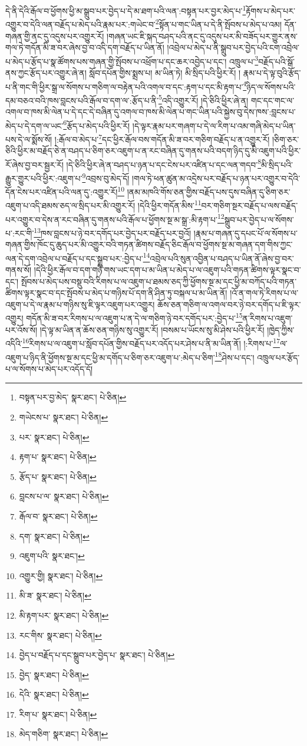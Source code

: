 དེ་ནི་དེའི་རྒོལ་བ་ཕྱོགས་ཕྱི་མ་སྒྲུབ་པར་བྱེད་པ་དེ་མ་ཐག་པའི་ལན་:བསྟན་པར་བྱར་མེད་པ་\footnote{བསྟན་པར་བྱ་མེད་  སྣར་ཐང་།  པེ་ཅིན། }རྟོགས་པ་མེད་པར་འགྱུར་བ་དེའི་ལན་བརྗོད་པ་མེད་པའི་རྣམ་པར་:གཡེང་བ་\footnote{གཡེངས་པ་  སྣར་ཐང་།  པེ་ཅིན། }སྟོན་པ་གང་ཡིན་པ་དེ་ནི་སྤོབས་པ་མེད་པ་འམ། དོན་གཞན་གྱི་ནང་དུ་འདུས་པར་འགྱུར་རོ། །གཞན་ཡང་ཇི་སྐད་བཤད་པའི་ནང་དུ་འདུས་པར་མི་བཟོད་པར་གྱུར་ནས་གལ་ཏེ་གདོན་མི་ཟ་བར་ཞེས་བྱ་བ་འདི་དག་བརྗོད་པ་ཡིན་ནོ། །འབྲེལ་པ་མེད་པ་ནི་སྒྲུབ་པར་བྱེད་པའི་ངག་འབྲེལ་པ་མེད་པ་རྩོད་པ་སྣ་ཚོགས་པས་གཞན་གྱི་སྤོབས་པ་འཕྲོག་པ་དང་ཆར་འབྱེད་པ་དང་། འཁྲུལ་པ་\footnote{པར་  སྣར་ཐང་།  པེ་ཅིན། }བརྗོད་པའི་སྒོ་ནས་ཀྱང་རྩོད་པར་འགྱུར་ཞེ་ན། སློབ་དཔོན་གྱིས་སྨྲས་པ། མ་ཡིན་ཏེ། མི་སྲིད་པའི་ཕྱིར་རོ། །
རྣམ་པ་དེ་ལྟ་བུའི་རྩོད་པ་ནི་གང་གི་ཕྱིར་སྒྲ་ལ་སོགས་པ་གཅིག་ལ་བརྟེན་པའི་འགལ་བ་དང་:རྟག་པ་དང་མི་རྟག་པ་\footnote{རྟག་པ་  སྣར་ཐང་།  པེ་ཅིན། }ཉིད་ལ་སོགས་པའི་དམ་བཅའ་བའི་ཁས་བླངས་པའི་རྒོལ་བ་དག་ལ་:རྩོད་པ་ནི་\footnote{རྩོད་པ་  སྣར་ཐང་།  པེ་ཅིན། }འདི་འགྱུར་རོ། །དེ་ཅིའི་ཕྱིར་ཞེ་ན། གང་དང་གང་ལ་འགལ་བ་ཁས་མི་ལེན་པ་དེ་དང་དེ་བཞིན་དུ་འགལ་བ་ཁས་མི་ལེན་པ་གང་ཡིན་པའི་སྐྱེས་བུ་དེས་ཁས་:བླངས་པ་མེད་པ་དེ་དག་ལ་ཡང་\footnote{བླངས་པ་ལ་  སྣར་ཐང་།  པེ་ཅིན། }རྩོད་པ་མེད་པའི་ཕྱིར་རོ། །དེ་ལྟར་རྣམ་པར་གཞག་པ་དེ་ལ་རིག་པ་འམ་གཞི་མེད་པ་ཡིན་པས་དེ་ལ་སྨོས་སོ། །:རྒོལ་བ་མེད་པ་\footnote{རྒོལ་བ་  སྣར་ཐང་།  པེ་ཅིན། }དང་ཕྱིར་རྒོལ་བས་གདོན་མི་ཟ་བར་གཅིག་བརྗོད་པ་ན་འགྱུར་རོ། །ཅིག་ཅར་ཅིའི་ཕྱིར་མ་བརྗོད་ཅེ་ན་བཤད་པ་ཅིག་ཅར་འཇུག་པ་ན་རང་བཞིན་དུ་གནས་པའི་བདག་ཉིད་དུ་མི་འཇུག་པའི་ཕྱིར་རོ་ཞེས་བྱ་བར་སྦྱར་རོ། །དེ་ཅིའི་ཕྱིར་ཞེ་ན་བཤད་པ་ཉན་པ་དང་ངེས་པར་འཛིན་པ་དང་ལན་གདབ་\footnote{དག་  སྣར་ཐང་།  པེ་ཅིན། }མི་སྲིད་པའི་རྒྱུར་གྱུར་པའི་ཕྱིར་:འཇུག་པ་\footnote{འཇུག་པའི་  སྣར་ཐང་། }འབྲས་བུ་མེད་དོ། །གལ་ཏེ་ཕན་ཚུན་མ་འདྲེས་པར་བརྗོད་པ་ཉན་པར་འགྱུར་བ་དེའི་དོན་ངེས་པར་འཛིན་པའི་ལན་དུ་:འགྱུར་རོ།\footnote{འགྱུར་གྱི།  སྣར་ཐང་།  པེ་ཅིན། } །ནམ་མཁའི་གོས་ཅན་གྱིས་བརྗོད་པས་དུས་བཞིན་དུ་ཅིག་ཅར་འཇུག་པ་འདི་ཐམས་ཅད་ལ་སྲིད་པར་མི་འགྱུར་རོ། །དེའི་ཕྱིར་གདོན་མིས་\footnote{མི་ཟ་  སྣར་ཐང་།  པེ་ཅིན། }བར་གཅིག་སྔར་བརྗོད་པ་ལས་བརྗོད་པར་འགྱུར་བ་དེས་ན་རང་བཞིན་དུ་གནས་པའི་རྒོལ་པ་ཕྱོགས་སྔ་མ་སྒྲ་:མི་རྟག་པ་\footnote{མི་རྟག་པར་  སྣར་ཐང་།  པེ་ཅིན། }སྒྲུབ་པར་བྱེད་པ་ལ་སོགས་པ་:རང་གི་\footnote{རང་གིས་  སྣར་ཐང་།  པེ་ཅིན། }ཁས་བླངས་པ་ཉེ་བར་དགོད་པར་བྱེད་པར་བརྗོད་པར་བྱའོ། །རྣམ་པ་གཞན་དུ་དཔང་པོ་ལ་སོགས་པ་གཞན་གྱིས་ཁོང་དུ་ཆུད་པར་མི་འགྱུར་བའི་གཏན་ཚིགས་བརྗོད་ཅིང་རྒོལ་བ་ཕྱོགས་སྔ་མ་གཞན་དག་གིས་ཀྱང་ལན་དེ་དག་འབྲེལ་པ་བརྗོད་པ་དང་སྒྲུབ་པར་:བྱེད་པ་\footnote{བྱེད་པ་བརྗོད་པ་དང་སྒྲུབ་པར་བྱེད་པ་  སྣར་ཐང་།  པེ་ཅིན། }འབྲེལ་པའི་སུན་འབྱིན་པ་བཤད་པ་ཡིན་ནོ་ཞེས་བྱ་བར་གནས་སོ། །དེའི་ཕྱིར་རྒོལ་བ་དག་གཉི་གས་ཡང་དག་པ་མ་ཡིན་པ་མེད་པ་ལ་འཇུག་པའི་གཏན་ཚིགས་ལྟར་སྣང་བ་དང་། སྤོབས་པ་མེད་པས་བསྡུ་བའི་རིགས་པ་ལ་འཇུག་པ་ཐམས་ཅད་ཀྱི་ཕྱོགས་སྔ་མ་དང་ཕྱི་མ་བཀོད་པའི་གཏན་ཚིགས་ལྟར་སྣང་བ་དང་སྤོབས་པ་མེད་པ་གཉིས་པོ་དག་ནི་ཤིན་ཏུ་བསྐལ་པ་མ་ཡིན་ནོ། །འོ་ན་གལ་ཏེ་རིགས་པ་ལ་འཇུག་པ་དེ་ལ་རྣམ་པ་གཉིས་སུ་ཇི་ལྟར་འཇུག་པར་འགྱུར། ཆོས་ཅན་གཅིག་ལ་འགལ་བར་ཉེ་བར་དགོད་པ་ཇི་ལྟར་འགྱུར། གདོན་མི་ཟ་བར་རིགས་པ་ལ་འཇུག་པ་ན་དེ་ལ་གཅིག་ཉེ་བར་དགོད་པར་:བྱེད་པ་\footnote{བྱེད་  སྣར་ཐང་།  པེ་ཅིན། }ན་རིགས་པ་འཇུག་པར་འོས་སོ། །དེ་ལྟ་མ་ཡིན་ན་ཆོས་ཅན་གཉིས་སུ་འགྱུར་རོ། །བསམ་པ་ཡོངས་སུ་མི་ཤེས་པའི་ཕྱིར་རོ། །ཁྱེད་ཀྱིས་འདིའི་\footnote{དེའི་  སྣར་ཐང་།  པེ་ཅིན། }རིགས་པ་ལ་འཇུག་པ་སློབ་དཔོན་གྱིས་བརྗོད་པར་འདོད་པར་ཤེས་པ་ནི་མ་ཡིན་ནོ། །:རིགས་པ་\footnote{རིག་པ་  སྣར་ཐང་།  པེ་ཅིན། }ལ་འཇུག་པ་ཉིད་ནི་ཕྱོགས་སྔ་མ་དང་ཕྱི་མ་དགོད་པ་ཅིག་ཅར་འཇུག་པ་:མེད་པ་ཅིག་\footnote{མེད་གཅིག་  སྣར་ཐང་།  པེ་ཅིན། }ཤེས་པ་དང་། འཁྲུལ་པར་རྩོད་པ་ལ་སོགས་པ་མེད་པར་འདོད་དོ། 